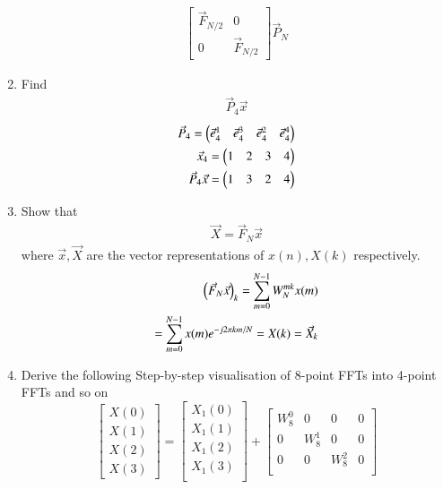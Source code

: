 \documentclass[journal,12pt,twocolumn]{IEEEtran}
\renewcommand\thesection{\arabic{section}}
\begin{document}
\begin{enumerate}[label=\arabic*.,ref=\thesection.\theenumi]
\begin{align}
		\begin{bmatrix}
			\vec{F}_{N/2} & 0 \\
			0 & \vec{F}_{N/2}
		\end{bmatrix}
		\vec{P}_{N}
	\end{align}
	\item Find 
	\begin{align}
		\vec{P}_4 \vec{x}
	\end{align}
	\solution
	\begin{align}
		\vec{P}_{4} = \myvec{\vec{e}_4^{1} &\vec{e}_4^{3} &\vec{e}_4^{2}	&\vec{e}_4^{4}}\\
		\vec{x}_4 = \myvec{1 & 2 & 3 & 4}\\%
		\vec{P}_{4}	\vec{x} = \myvec{1 & 3 & 2 & 4}
	\end{align}
	\item Show that 
	\begin{align}
		\vec{X} = \vec{F}_N \vec{x}
		\label{eq:dft-mat-def}
	\end{align}
	where $\vec{x}, \vec{X}$ are the vector representations of $x(n), X(k)$ respectively.\\
	\solution
	\begin{align}
		\left(\vec{F}_{N}\vec{x}\right)_{k} = \sum_{m=0}^{N-1}W_{N}^{mk}x(m)\\
		= \sum_{m=0}^{N-1} x(m) e^{-j 2 \pi k m / N}
		= X(k) = \vec{X}_{k} 
	\end{align}
	\item Derive the following Step-by-step visualisation  of
	8-point FFTs into 4-point FFTs and so on
	\begin{equation}
		\begin{bmatrix}
			X(0) \\ 
			X(1) \\ 
			X(2) \\ 
			X(3)
		\end{bmatrix}
		=
		\begin{bmatrix}
			X_{1}(0) \\ 
			X_{1}(1)\\ 
			X_{1}(2)\\
			X_{1}(3)\\
		\end{bmatrix}
		+
		\begin{bmatrix}
			W^{0}_{8} & 0 & 0 & 0\\
			0 & W^{1}_{8} & 0 & 0\\
			0 & 0 & W^{2}_{8} & 0\\

\end{bmatrix}
\end{equation}
\end{enumerate}
\end{document}
